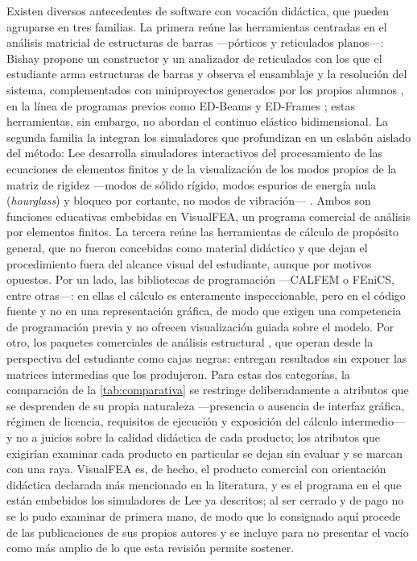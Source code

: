 Existen diversos antecedentes de software con vocación didáctica, que pueden agruparse en tres familias. La primera reúne las herramientas centradas en el análisis matricial de estructuras de barras —pórticos y reticulados planos—: Bishay propone un constructor y un analizador de reticulados con los que el estudiante arma estructuras de barras y observa el ensamblaje y la resolución del sistema, complementados con miniproyectos generados por los propios alumnos \autocite[pp.~5-6]{bishay2020teaching}, en la línea de programas previos como ED-Beams y ED-Frames \autocite[pp.~243-244]{suarez1998edelas2d}; estas herramientas, sin embargo, no abordan el continuo elástico bidimensional. La segunda familia la integran los simuladores que profundizan en un eslabón aislado del método: Lee desarrolla simuladores interactivos del procesamiento de las ecuaciones de elementos finitos \autocite{lee2015interactive} y de la visualización de los modos propios de la matriz de rigidez —modos de sólido rígido, modos espurios de energía nula (\emph{hourglass}) y bloqueo por cortante, no modos de vibración— \autocite{lee2015eigenmodes}. Ambos son funciones educativas embebidas en VisualFEA, un programa comercial de análisis por elementos finitos. La tercera reúne las herramientas de cálculo de propósito general, que no fueron concebidas como material didáctico y que dejan el procedimiento fuera del alcance visual del estudiante, aunque por motivos opuestos. Por un lado, las bibliotecas de programación —CALFEM o FEniCS, entre otras—: en ellas el cálculo es enteramente inspeccionable, pero en el código fuente y no en una representación gráfica, de modo que exigen una competencia de programación previa y no ofrecen visualización guiada sobre el modelo. Por otro, los paquetes comerciales de análisis estructural \autocite{csi2017sap2000}, que operan desde la perspectiva del estudiante como cajas negras: entregan resultados sin exponer las matrices intermedias que los produjeron. Para estas dos categorías, la comparación de la \autoref{tab:comparativa} se restringe deliberadamente a atributos que se desprenden de su propia naturaleza —presencia o ausencia de interfaz gráfica, régimen de licencia, requisitos de ejecución y exposición del cálculo intermedio— y no a juicios sobre la calidad didáctica de cada producto; los atributos que exigirían examinar cada producto en particular se dejan sin evaluar y se marcan con una raya. VisualFEA es, de hecho, el producto comercial con orientación didáctica declarada más mencionado en la literatura, y es el programa en el que están embebidos los simuladores de Lee ya descritos; al ser cerrado y de pago no se lo pudo examinar de primera mano, de modo que lo consignado aquí procede de las publicaciones de sus propios autores y se incluye para no presentar el vacío como más amplio de lo que esta revisión permite sostener.

